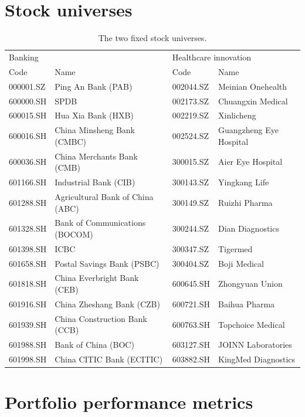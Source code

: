 \documentclass[pdflatex,sn-mathphys-num]{sn-jnl}%
\theoremstyle{thmstyleone}%
\theoremstyle{thmstyletwo}%
\theoremstyle{thmstylethree}%
\begin{document}
{\color{blue}
\section{Stock universes}\label{app:universe}
\begin{table}[!h]
\centering\small
\caption{The two fixed stock universes.}
\label{tab:universe}
\setlength{\tabcolsep}{4pt}
\begin{tabular}{llll}
\toprule
\multicolumn{2}{l}{Banking} & \multicolumn{2}{l}{Healthcare innovation} \\
Code & Name & Code & Name \\
\midrule
000001.SZ & Ping An Bank (PAB) & 002044.SZ & Meinian Onehealth \\
600000.SH & SPDB & 002173.SZ & Chuangxin Medical \\
600015.SH & Hua Xia Bank (HXB) & 002219.SZ & Xinlicheng \\
600016.SH & China Minsheng Bank (CMBC) & 002524.SZ & Guangzheng Eye Hospital \\
600036.SH & China Merchants Bank (CMB) & 300015.SZ & Aier Eye Hospital \\
601166.SH & Industrial Bank (CIB) & 300143.SZ & Yingkang Life \\
601288.SH & Agricultural Bank of China (ABC) & 300149.SZ & Ruizhi Pharma \\
601328.SH & Bank of Communications (BOCOM) & 300244.SZ & Dian Diagnostics \\
601398.SH & ICBC & 300347.SZ & Tigermed \\
601658.SH & Postal Savings Bank (PSBC) & 300404.SZ & Boji Medical \\
601818.SH & China Everbright Bank (CEB) & 600645.SH & Zhongyuan Union \\
601916.SH & China Zheshang Bank (CZB) & 600721.SH & Baihua Pharma \\
601939.SH & China Construction Bank (CCB) & 600763.SH & Topchoice Medical \\
601988.SH & Bank of China (BOC) & 603127.SH & JOINN Laboratories \\
601998.SH & China CITIC Bank (ECITIC) & 603882.SH & KingMed Diagnostics \\
\bottomrule
\end{tabular}
\end{table}
\par}
\section{Portfolio performance metrics}\label{app:portfolio_metrics}
\end{document}
